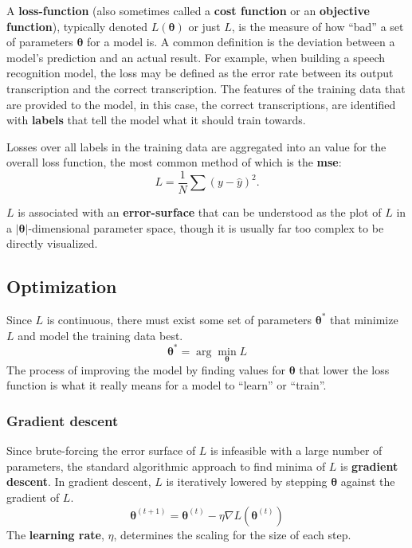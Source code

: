 \documentclass[12pt]{report}
\theoremstyle{definition}
\theoremstyle{remark}
\begin{document}
A \textbf{\gls{loss-function}} (also sometimes called a \textbf{cost function} or an \textbf{objective function}), typically denoted $L(\boldsymbol{\theta})$ or just $L$, is the measure of how ``bad'' a set of parameters $\boldsymbol{\theta}$ for a model is. A common definition is the deviation between a model's prediction and an actual result. For example, when building a speech recognition model, the loss may be defined as the error rate between its output transcription and the correct transcription. The features of the training data that are provided to the model, in this case, the correct transcriptions, are identified with \textbf{\glspl{label}} that tell the model what it should train towards.

Losses over all labels in the training data are aggregated into an value for the overall loss function, the most common method of which is the \textbf{\gls{mse}}:
\begin{equation}
    L = \frac{1}{N}\sum (y - \hat{y})^2 .
\end{equation}

$L$ is associated with an \textbf{\gls{error-surface}} that can be understood as the plot of $L$ in a $|\boldsymbol{\theta}|$-dimensional parameter space, though it is usually far too complex to be directly visualized.

\subsection{Optimization}\label{sec:optimization}

Since $L$ is continuous, there must exist some set of parameters $\boldsymbol{\theta}^\ast$ that minimize $L$ and model the training data best.
\begin{equation}
    \boldsymbol{\theta}^\ast = \arg\min_{\boldsymbol{\theta}} L
\end{equation}
The process of improving the model by finding values for $\boldsymbol{\theta}$ that lower the loss function is what it really means for a model to ``learn'' or ``train''.

\subsubsection{Gradient descent}

Since brute-forcing the error surface of $L$ is infeasible with a large number of parameters, the standard algorithmic approach to find minima of $L$ is \textbf{gradient descent}. In gradient descent, $L$ is iteratively lowered by stepping $\boldsymbol{\theta}$ against the gradient of $L$.
\begin{equation}
    \boldsymbol{\theta}^{(t+1)} = \boldsymbol{\theta}^{(t)}-\eta\nabla L(\boldsymbol{\theta}^{(t)})
\end{equation}
The \textbf{learning rate}, $\eta$, determines the scaling for the size of each step.
\end{document}
